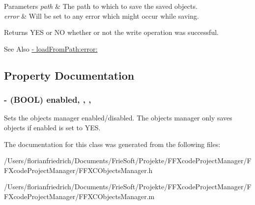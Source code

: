 \begin{DoxyParams}{Parameters}
{\em path} & The path to which to save the saved objects. \\
\hline
{\em error} & Will be set to any error which might occur while saving. \\
\hline
\end{DoxyParams}
\begin{DoxyReturn}{Returns}
Y\-E\-S or N\-O whether or not the write operation was successful. 
\end{DoxyReturn}
\begin{DoxySeeAlso}{See Also}
\hyperlink{interface_f_f_x_c_objects_manager_a279009acd03a26c48b2c6d7967d2cbbf}{-\/ load\-From\-Path\-:error\-:} 
\end{DoxySeeAlso}


\subsection{Property Documentation}
\hypertarget{interface_f_f_x_c_objects_manager_ac19b89f25c9dfa8d24866a5c108d6477}{
\subsubsection[{enabled}]{\setlength{\rightskip}{0pt plus 5cm}-\/ (B\-O\-O\-L) enabled\hspace{0.3cm}{\ttfamily [read]}, {\ttfamily [write]}, {\ttfamily [nonatomic]}, {\ttfamily [assign]}}}\label{interface_f_f_x_c_objects_manager_ac19b89f25c9dfa8d24866a5c108d6477}
Sets the objects manager enabled/disabled. The objects manager only saves objects if enabled is set to Y\-E\-S. 

The documentation for this class was generated from the following files\-:\begin{DoxyCompactItemize}
\item 
/\-Users/florianfriedrich/\-Documents/\-Frie\-Soft/\-Projekte/\-F\-F\-Xcode\-Project\-Manager/\-F\-F\-Xcode\-Project\-Manager/F\-F\-X\-C\-Objects\-Manager.\-h\item 
/\-Users/florianfriedrich/\-Documents/\-Frie\-Soft/\-Projekte/\-F\-F\-Xcode\-Project\-Manager/\-F\-F\-Xcode\-Project\-Manager/F\-F\-X\-C\-Objects\-Manager.\-m\end{DoxyCompactItemize}
